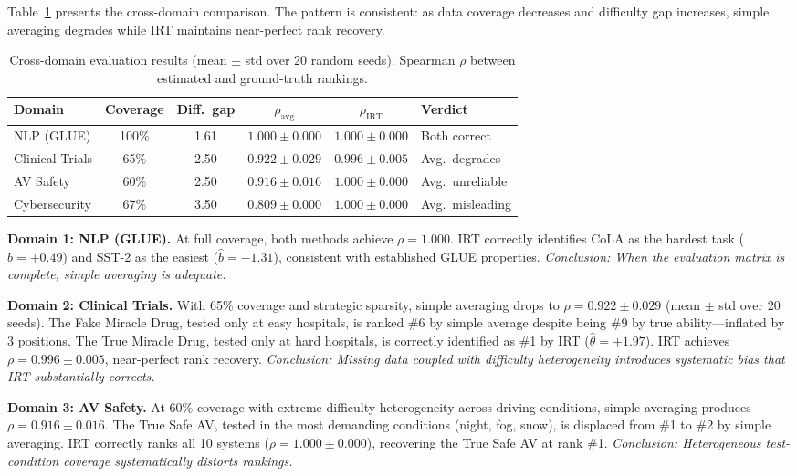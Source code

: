 \documentclass[11pt,a4paper]{article}
\begin{document}
Table~\ref{tab:main} presents the cross-domain comparison. The pattern is consistent: as data coverage decreases and difficulty gap increases, simple averaging degrades while IRT maintains near-perfect rank recovery.

\begin{table}[t]
\centering
\caption{Cross-domain evaluation results (mean $\pm$ std over 20 random seeds). Spearman $\rho$ between estimated and ground-truth rankings.}
\label{tab:main}
\small
\begin{tabular}{lccccl}
\toprule
Domain & Coverage & Diff.\ gap & $\rho_{\text{avg}}$ & $\rho_{\text{IRT}}$ & Verdict \\
\midrule
NLP (GLUE) & 100\% & 1.61 & $1.000 \pm 0.000$ & $1.000 \pm 0.000$ & Both correct \\
Clinical Trials & 65\% & 2.50 & $0.922 \pm 0.029$ & $0.996 \pm 0.005$ & Avg.\ degrades \\
AV Safety & 60\% & 2.50 & $0.916 \pm 0.016$ & $1.000 \pm 0.000$ & Avg.\ unreliable \\
Cybersecurity & 67\% & 3.50 & $0.809 \pm 0.000$ & $1.000 \pm 0.000$ & Avg.\ misleading \\
\bottomrule
\end{tabular}
\end{table}

\textbf{Domain 1: NLP (GLUE).} At full coverage, both methods achieve $\rho = 1.000$. IRT correctly identifies CoLA as the hardest task ($\hat{b} = +0.49$) and SST-2 as the easiest ($\hat{b} = -1.31$), consistent with established GLUE properties. \emph{Conclusion: When the evaluation matrix is complete, simple averaging is adequate.}

\textbf{Domain 2: Clinical Trials.} With 65\% coverage and strategic sparsity, simple averaging drops to $\rho = 0.922 \pm 0.029$ (mean $\pm$ std over 20 seeds). The Fake Miracle Drug, tested only at easy hospitals, is ranked \#6 by simple average despite being \#9 by true ability---inflated by 3 positions. The True Miracle Drug, tested only at hard hospitals, is correctly identified as \#1 by IRT ($\hat{\theta} = +1.97$). IRT achieves $\rho = 0.996 \pm 0.005$, near-perfect rank recovery. \emph{Conclusion: Missing data coupled with difficulty heterogeneity introduces systematic bias that IRT substantially corrects.}

\textbf{Domain 3: AV Safety.} At 60\% coverage with extreme difficulty heterogeneity across driving conditions, simple averaging produces $\rho = 0.916 \pm 0.016$. The True Safe AV, tested in the most demanding conditions (night, fog, snow), is displaced from \#1 to \#2 by simple averaging. IRT correctly ranks all 10 systems ($\rho = 1.000 \pm 0.000$), recovering the True Safe AV at rank \#1. \emph{Conclusion: Heterogeneous test-condition coverage systematically distorts rankings.}
\end{document}
